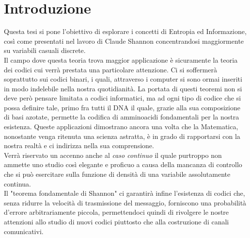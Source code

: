 \chapter*{Introduzione} %
\label{sommario}
\vspace{15pt}

Questa tesi si pone l'obiettivo di esplorare i concetti di Entropia ed Informazione, così come presentati nel lavoro di Claude Shannon \cite{Shannon} concentrandosi maggiormente su variabili casuali discrete.\\
Il campo dove questa teoria trova maggior applicazione è sicuramente la teoria dei codici cui verrà prestata una particolare attenzione. Ci si soffermerà soprattutto sui codici binari, i quali, attraverso i computer si sono ormai inseriti in modo indelebile nella nostra quotidianità. La portata di questi teoremi non si deve però pensare limitata a codici informatici, ma ad ogni tipo di codice che si possa definire tale, primo fra tutti il DNA il quale, grazie alla sua composizione di basi azotate, permette la codifica di amminoacidi fondamentali per la nostra esistenza. Queste applicazioni dimostrano ancora una volta che la Matematica, nonostante venga ritenuta una scienza astratta, è in grado di rapportarsi con la nostra realtà e ci indirizza nella sua comprensione.\\
Verrà riservato un accenno anche al \textit{caso continuo} il quale purtroppo non ammette uno studio così elegante e proficuo a causa della mancanza di controllo che si può esercitare sulla funzione di densità di una variabile assolutamente continua.\\
Il "teorema fondamentale di Shannon" ci garantirà infine l'esistenza di codici che, senza ridurre la velocità di trasmissione del messaggio, forniscono una probabilità d'errore arbitrariamente piccola, permettendoci quindi di rivolgere le nostre attenzioni allo studio di nuovi codici piuttosto che alla costruzione di canali comunicativi.


\clearpage


